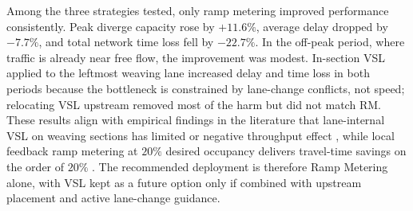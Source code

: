 \documentclass[11pt,a4paper]{article}
\begin{document}
Among the three strategies tested, only ramp metering improved performance consistently. Peak diverge capacity rose by $+11.6\%$, average delay dropped by $-7.7\%$, and total network time loss fell by $-22.7\%$. In the off-peak period, where traffic is already near free flow, the improvement was modest. In-section VSL applied to the leftmost weaving lane increased delay and time loss in both periods because the bottleneck is constrained by lane-change conflicts, not speed; relocating VSL upstream removed most of the harm but did not match RM. These results align with empirical findings in the literature that lane-internal VSL on weaving sections has limited or negative throughput effect \cite{vsl:grumert_tapani_2018,vsl:abdelaty_2017}, while local feedback ramp metering at $20\%$ desired occupancy delivers travel-time savings on the order of $20\%$ \cite{rm:alinea_1991,rm:abuamer_2017,rm:fhwa_2014}. The recommended deployment is therefore Ramp Metering alone, with VSL kept as a future option only if combined with upstream placement and active lane-change guidance.

\end{document}
